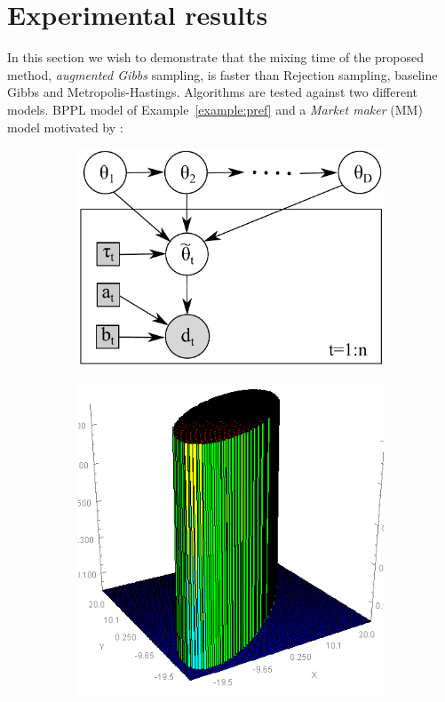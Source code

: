 \section{Experimental results}
\label{sect:experiment}

In this section we wish to demonstrate that the mixing time of the proposed method, \emph{augmented Gibbs} sampling, is faster than Rejection sampling, baseline Gibbs and Metropolis-Hastings.     
Algorithms are tested against two different models.  BPPL model of Example~\ref{example:pref} and a \emph{Market maker} (MM) model motivated by \cite{Das:08}:

\begin{figure}
\centering
\begin{subfigure}{.35\textwidth}
\centering
\includegraphics[width=.90\textwidth]{pic/market4w.pdf}
\caption{}%
\label{fig:market}
\end{subfigure}
\begin{subfigure}{.24\textwidth}%
  \centering
  \includegraphics[width=.82\textwidth]{pic/elipsePrior.png}

\end{subfigure}
\end{figure}
